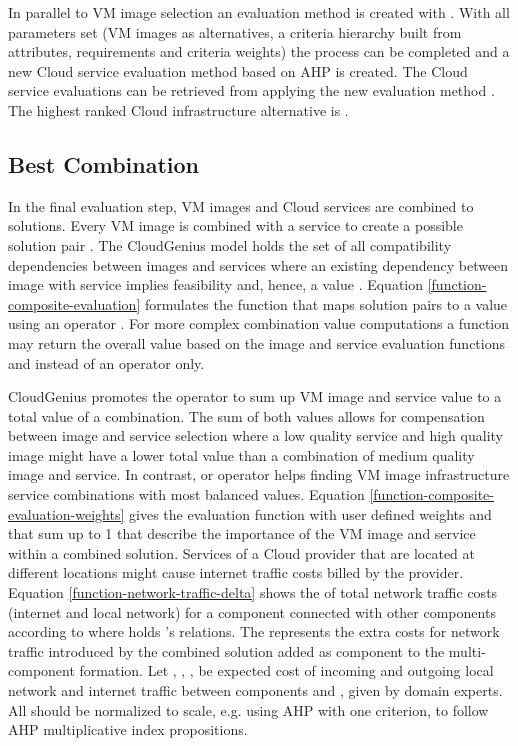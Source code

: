 \documentclass[10pt]{article}
\begin{document}
In parallel to VM image selection an evaluation method is created with . With all parameters set (VM images as alternatives, a criteria hierarchy built from attributes, requirements  and criteria weights) the  process can be completed and a new Cloud service evaluation method based on AHP is created. The Cloud service evaluations can be retrieved from applying the new evaluation method . The highest ranked Cloud infrastructure alternative is .

\subsection{Best Combination}

In the final evaluation step, VM images and Cloud services are combined to solutions. Every VM image  is combined with a service  to create a possible solution pair . The CloudGenius model holds the set  of all compatibility dependencies between images and services where an existing dependency between image  with service  implies feasibility and, hence, a value . Equation \ref{function-composite-evaluation} formulates the function that maps solution pairs to a value using an operator . For more complex combination value computations a function  may return the overall value based on the image and service evaluation functions  and  instead of an operator  only. 




CloudGenius promotes the  operator to sum up VM image and service value to a total value of a combination. The sum of both values allows for compensation between image and service selection where a low quality service and high quality image might have a lower total value than a combination of medium quality image and service. In contrast,  or  operator helps finding VM image infrastructure service combinations with most balanced values. Equation \ref{function-composite-evaluation-weights} gives the evaluation function with user defined weights  and  that sum up to 1 that describe the importance of the VM image and service within a combined solution.
Services of a Cloud provider that are located at different locations might cause internet traffic costs billed by the provider. 
Equation \ref{function-network-traffic-delta} shows the  of total network traffic costs (internet and local network) for a component  connected with other components according to  where  holds 's relations. The  represents the extra costs for network traffic introduced by the combined solution added as component to the multi-component formation. Let , , ,  be expected cost of incoming and outgoing local network and internet traffic between components  and , given by domain experts. All  should be normalized to  scale, e.g. using AHP with one criterion, to follow AHP multiplicative index propositions.
\end{document}
